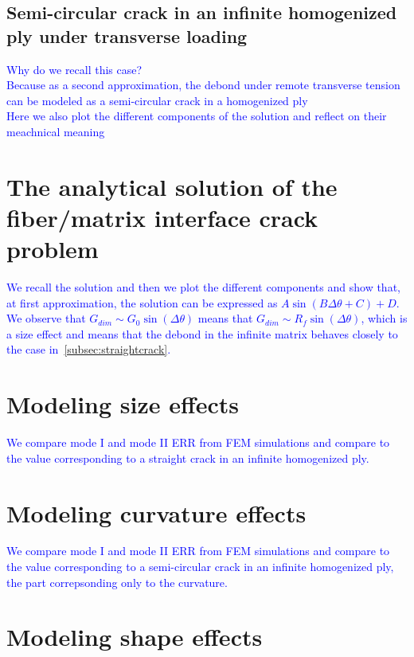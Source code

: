\documentclass[review]{elsarticle}
\begin{document}
\subsection{Semi-circular crack in an infinite homogenized ply under transverse loading}

\textcolor{blue}{Why do we recall this case?\\Because as a second approximation, the debond under remote transverse tension can be modeled as a semi-circular crack in a homogenized ply\\Here we also plot the different components of the solution and reflect on their meachnical meaning}

\section{The analytical solution of the fiber/matrix interface crack problem}

\textcolor{blue}{We recall the solution and then we plot the different components and show that, at first approximation, the solution can be expressed as $A\sin{\left(B\Delta\theta+C\right)+D}$. We observe that $G_{dim}\sim G_{0}\sin{\left(\Delta\theta\right)}$ means that $G_{dim}\sim R_{f}\sin{\left(\Delta\theta\right)}$, which is a size effect and means that the debond in the infinite matrix behaves closely to the case in~\ref{subsec:straightcrack}.}

\section{Modeling size effects}

\textcolor{blue}{We compare mode I and mode II ERR from FEM simulations and compare to the value corresponding to a straight crack in an infinite homogenized ply.}

\section{Modeling curvature effects}

\textcolor{blue}{We compare mode I and mode II ERR from FEM simulations and compare to the value corresponding to a semi-circular crack in an infinite homogenized ply, the part correpsonding only to the curvature.}

\section{Modeling shape effects}
\end{document}
